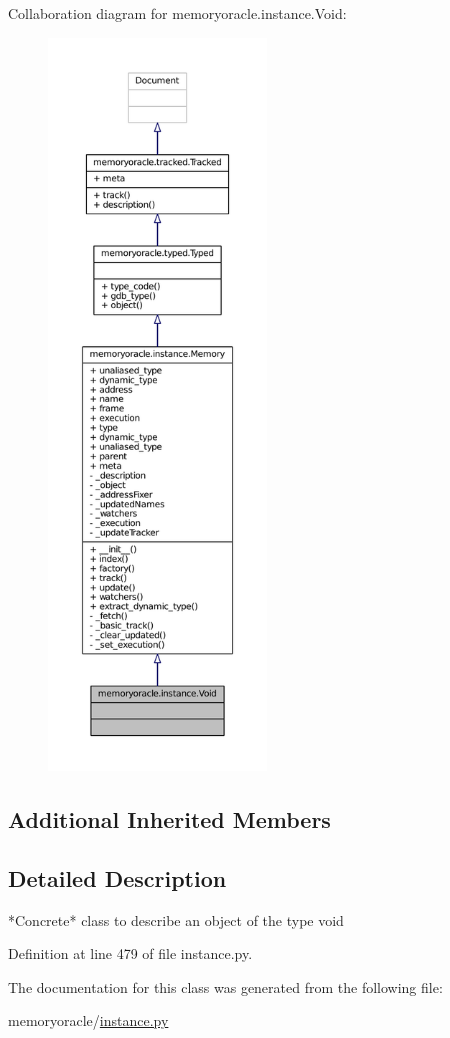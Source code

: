 Collaboration diagram for memoryoracle.\+instance.\+Void\+:
\nopagebreak
\begin{figure}[H]
\begin{center}
\leavevmode
\includegraphics[height=550pt]{classmemoryoracle_1_1instance_1_1Void__coll__graph}
\end{center}
\end{figure}
\subsection*{Additional Inherited Members}


\subsection{Detailed Description}
\begin{DoxyVerb}*Concrete* class to describe an object of the type void
\end{DoxyVerb}
 

Definition at line 479 of file instance.\+py.



The documentation for this class was generated from the following file\+:\begin{DoxyCompactItemize}
\item 
memoryoracle/\hyperlink{instance_8py}{instance.\+py}\end{DoxyCompactItemize}
